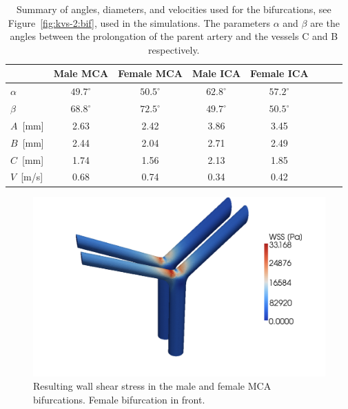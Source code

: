\begin{table}
  \centering
  \begin{tabular}{l|*{6}{c}r}
    & Male MCA & Female MCA & Male ICA & Female ICA \\
    \hline
    $\alpha$	  & $49.7^\circ$ & $50.5^\circ$   & $62.8^\circ$ & $57.2^\circ$\\
    $\beta$		  & $68.8^\circ$ & $72.5^\circ$   & $49.7^\circ$ & $50.5^\circ$\\
    $A$~[mm]		  & 2.63 & 2.42   & 3.86 & 3.45\\
    $B$~[mm]           & 2.44 & 2.04   & 2.71 & 2.49\\
    $C$~[mm] 	  & 1.74 & 1.56   & 2.13 & 1.85\\
    $V$~[m/s]	  & 0.68   & 0.74     & 0.34   & 0.42  \\
  \end{tabular}
  \caption{Summary of angles, diameters, and velocities used for the
    bifurcations, see Figure~\ref{fig:kvs-2:bif}, used in the simulations. The parameters $\alpha$ and $\beta$ are the angles
    between the prolongation of the parent artery and the vessels C
    and B respectively.}
  \label{bcs}
\end{table}

\begin{figure}
  \centering
  \includegraphics[width=\largefig]{chapters/kvs-2/pdf/mcas_wss_II4.pdf}
  \caption{Resulting wall shear stress in the male and female MCA
    bifurcations. Female bifurcation in front.}
  \label{fig:kvs-2:mca_wss_res}
\end{figure}

